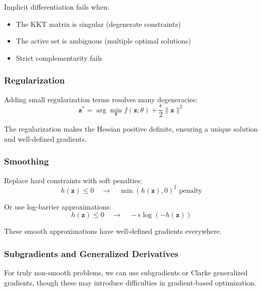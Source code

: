 Implicit differentiation fails when:
\begin{itemize}
    \item The KKT matrix is singular (degenerate constraints)
    \item The active set is ambiguous (multiple optimal solutions)
    \item Strict complementarity fails
\end{itemize}

\subsubsection{Regularization}

Adding small regularization terms resolves many degeneracies:
\begin{equation}
\mathbf{z}^* = \arg\min_{\mathbf{z}} f(\mathbf{z}; \theta) + \frac{\epsilon}{2} \| \mathbf{z} \|^2
\end{equation}

The regularization makes the Hessian positive definite, ensuring a unique solution and well-defined gradients.

\subsubsection{Smoothing}

Replace hard constraints with soft penalties:
\begin{equation}
h(\mathbf{z}) \leq 0 \quad \to \quad \min(h(\mathbf{z}), 0)^2 \text{ penalty}
\end{equation}

Or use log-barrier approximations:
\begin{equation}
h(\mathbf{z}) \leq 0 \quad \to \quad -\epsilon \log(-h(\mathbf{z}))
\end{equation}

These smooth approximations have well-defined gradients everywhere.

\subsubsection{Subgradients and Generalized Derivatives}

For truly non-smooth problems, we can use subgradients or Clarke generalized gradients, though these may introduce difficulties in gradient-based optimization.



